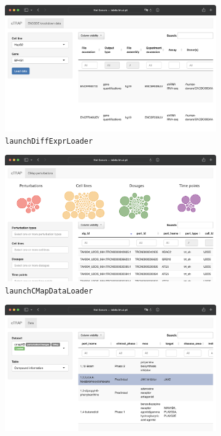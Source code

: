 \begin{figure}[!ht]
	\centering
	\begin{subfigure}[h]{0.3\textwidth}
		\includegraphics[width=\textwidth]{images/ctrap/ui/launchDiffExprLoader}
		\caption{\footnotesize{\texttt{launchDiffExprLoader}}}
	\end{subfigure}
	\begin{subfigure}[h]{0.3\textwidth}
		\includegraphics[width=\textwidth]{images/ctrap/ui/launchCMapDataLoader}
		\caption{\footnotesize{\texttt{launchCMapDataLoader}}}
	\end{subfigure}
	\begin{subfigure}[h]{0.3\textwidth}
		\includegraphics[width=\textwidth]{images/ctrap/ui/launchMetadataViewer}

\end{subfigure}
\end{figure}
